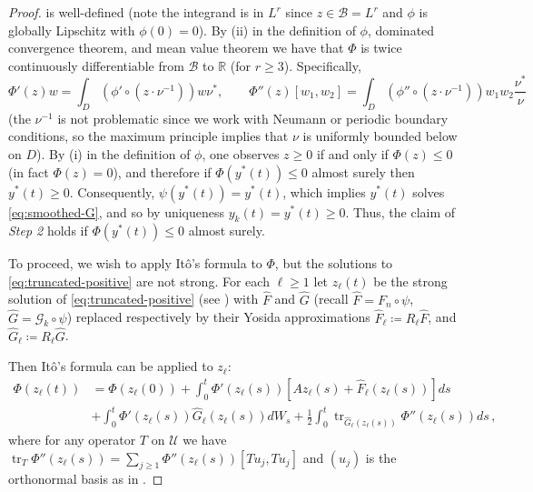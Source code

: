 \documentclass[final]{amsart}
\numberwithin{thm}{section}
\numberwithin{equation}{section}
\newcommand{\U}{\mathcal{U}}
\newcommand{\R}{\mathbb{R}}
\newcommand{\tr}{\operatorname{tr}}
\newcommand{\B}{\mathcal{B}}
\begin{document}
\begin{proof}
    
    is well-defined (note the integrand is in $L^r$ since $z \in \B = L^r$ and $\phi$ is globally Lipschitz with $\phi(0) = 0$). By (ii) in the definition of $\phi$, dominated convergence theorem, and mean value theorem we have that $\Phi$ is twice continuously differentiable from $\B$ to $\R$ (for $r \geq 3$). Specifically,
    \begin{equation}\label{eq:phi-double-prime}
        \Phi'(z)w = \int_D (\phi' \circ(z \cdot \nu^{-1}))w\nu^*, \qquad 
    \Phi''(z)[w_1, w_2] = \int_D (\phi'' \circ(z \cdot \nu^{-1}))w_1w_2\frac{\nu^*}{\nu}
    \end{equation}
    (the $\nu^{-1}$ is not problematic since we work with Neumann or periodic boundary conditions, so the maximum principle implies that $\nu$ is uniformly bounded below on $D$).
    By (i) in the definition of $\phi$, one observes $z \geq 0$ if and only if $\Phi(z) \leq 0$ (in fact $\Phi(z) = 0$), and therefore if $\Phi(y^*(t)) \leq 0$ almost surely then $y^*(t) \geq 0$. Consequently, $\psi(y^*(t)) = y^*(t)$, which implies $y^*(t)$ solves \eqref{eq:smoothed-G}, and so by uniqueness $y_k(t) = y^*(t) \geq 0$. Thus, the claim of \textit{Step 2} holds if $\Phi(y^*(t)) \leq 0$ almost surely.

      To proceed, we wish to apply It\^o's formula \cite[Theorem 2.4]{ito-formula} to $\Phi$, but the solutions to \eqref{eq:truncated-positive} are not strong. For each $\ell \geq 1$ let $z_\ell(t)$ be the  strong solution of \eqref{eq:truncated-positive} (see ) 
with $\hat{F}$ and $\hat{G}$ (recall $\hat{F} = F_n \circ \psi$, 
$\hat{G} = \mathcal{G}_k \circ \psi$) replaced respectively by their
      Yosida approximations  $\hat F_\ell \coloneqq R_\ell \hat F$, and $\hat G_\ell \coloneqq R_\ell \hat G$.

    Then It\^o's formula can be applied to $z_\ell$:
    \begin{equation}\label{eq:ito-positivity}
        \begin{aligned}
        \Phi(z_\ell(t)) &= \Phi(z_\ell(0)) + \int_0^t \Phi'(z_\ell(s))[Az_\ell(s) + \hat F_\ell(z_\ell(s))]ds \\
        &+ \int_0^t \Phi'(z_\ell(s))\hat G_\ell(z_\ell(s))dW_s + \frac{1}{2}\int_0^t \tr_{\hat G_\ell(z_\ell(s))}\Phi''(z_\ell(s))ds \,,
    \end{aligned}
    \end{equation}
where for any operator $T$ on $\U$ we have $\tr_{T}\Phi''(z_\ell(s)) = \sum_{j \geq 1} \Phi''(z_\ell(s))[Tu_j, Tu_j]$ and $(u_j)$ is the orthonormal basis as in .
    

\end{proof}
\end{document}
